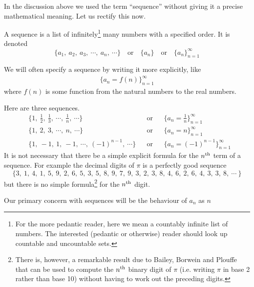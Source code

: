 In the discussion above we used the term ``sequence'' without giving
it a precise mathematical meaning. Let us rectify this now.
\begin{defn}\label{def:SRsequence}
A sequence is a list of infinitely\footnote{For the more pedantic reader,
here we mean a countably infinite list of numbers. The interested (pedantic or otherwise) reader should look up countable and uncountable sets.}
many numbers with a specified order.
It is denoted
\begin{equation*}
\big\{a_1,\ a_2,\ a_3,\  \cdots,\ a_n,\ \cdots\big\}
\quad\text{or}\quad
\big\{a_n\big\}
\quad\text{or}\quad
\big\{a_n\big\}_{n=1}^\infty
\end{equation*}
\end{defn}
\noindent We will often specify a sequence by writing it more explicitly, like
\begin{align*}
\Big\{ a_n = f(n) \Big\}_{n=1}^\infty
\end{align*}
where $f(n)$ is some function from the natural numbers to the real numbers.
\begin{eg}\label{eg:SRsequence}
Here are three sequences.
\begin{align*}
&\Big\{1,\ \frac{1}{2},\ \frac{1}{3},\ \cdots,\ \frac{1}{n},\ \cdots\Big\}
&&\text{or}
&&\Big\{a_n=\frac{1}{n}\Big\}_{n=1}^\infty \\[0.1in]
&\Big\{1,\ 2,\ 3,\ \cdots,\ n,\ \cdots\Big\}
&&\text{or}
&&\Big\{a_n=n\Big\}_{n=1}^\infty \\[0.1in]
&\Big\{1,\ -1,\ 1,\ -1,\ \cdots,\ (-1)^{n-1},\ \cdots\Big\}
&&\text{or}
&&\Big\{a_n=(-1)^{n-1}\Big\}_{n=1}^\infty
\end{align*}
It is not necessary that there be a simple explicit formula for the
$n^{\rm th}$ term of a sequence. For example the decimal digits of
$\pi$ is a perfectly good sequence
\begin{equation*}
\big\{3,\ 1,\ 4,\ 1,\ 5,\ 9,\ 2,\ 6,\ 5,\ 3,\ 5,\ 8,\ 9,\ 7,\ 9,\ 3,\ 2,\ 3,\
8,\ 4,\ 6,\ 2,\ 6,\ 4,\ 3,\ 3,\ 8,\ \cdots\ \big\}
\end{equation*}
but there is no simple formula\footnote{There is, however, a remarkable
result due to Bailey, Borwein and Plouffe that can be used to compute
the $n^{\rm th}$ binary digit of $\pi$ (i.e. writing $\pi$ in base 2 rather
than base 10) without having to work out the preceding digits.} for the $n^{\rm th}$ digit.

\end{eg}
Our primary concern with sequences will be the behaviour of $a_n$ as $n$

